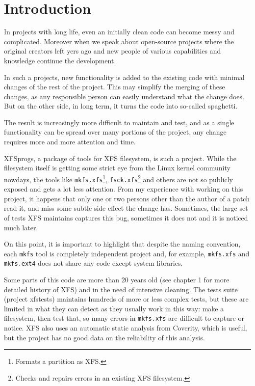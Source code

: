 
\chapter{Introduction}\label{chap:introduction}


In projects with long life, even an initially clean code can become messy and complicated. Moreover when we speak about open-source projects where the original creators left yers ago and new people of various capabilities and knowledge continue the development.

In such a projects, new functionality is added to the existing code with minimal changes of the rest of the project. This may simplify the merging of these changes, as any responsible person can easily understand what the change does. But on the other side, in long term, it turns the code into so-called spaghetti.

The result is increasingly more difficult to maintain and test, and as a single functionality can be spread over many portions of the project, any change requires more and more attention and time.

XFSprogs, a package of tools for XFS filesystem, is such a project. While the filesystem itself is getting some strict eye from the Linux kernel community nowdays, the tools like {\tt mkfs.xfs}\footnote{Formats a partition as XFS.}, {\tt fsck.xfs}\footnote{Checks and repairs errors in an existing XFS filesystem.} and others are not so publicly exposed and gets a lot less attention. From my experience with working on this project, it happens that only one or two persons other than the author of a patch read it, and miss some subtle side effect the change has. Sometimes, the large set of tests XFS maintains captures this bug, sometimes it does not and it is noticed much later.

On this point, it is important to highlight that despite the naming
convention, each {\tt mkfs} tool is completely independent project and, for
example, {\tt mkfs.xfs} and {\tt mkfs.ext4} does not share any code except
system libraries.

Some parts of this code are more than 20 years old (see chapter 1 for more detailed history of XFS) and in the need of intensive cleaning. The tests suite (project xfstests) maintains hundreds of more or less complex tests, but these are limited in what they can detect as they usually work in this way: make a filesystem, then test that, so many errors in {\tt mkfs.xfs} are difficult to capture or notice. XFS also uses an automatic static analysis from Coverity, which is useful, but the project has no good data on the reliability of this analysis.


